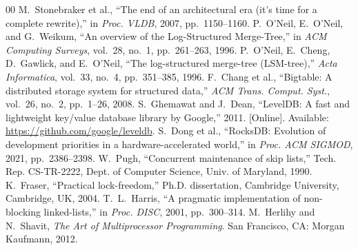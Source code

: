 \documentclass[conference]{IEEEtran}
\begin{document}
\begin{thebibliography}{00}
 M.~Stonebraker et al., ``The end of an architectural era (it's time for a complete rewrite),'' in \textit{Proc. VLDB}, 2007, pp.~1150--1160.
 P.~O'Neil, E.~O'Neil, and G.~Weikum, ``An overview of the Log-Structured Merge-Tree,'' in \textit{ACM Computing Surveys}, vol.~28, no.~1, pp.~261--263, 1996.
 P.~O'Neil, E.~Cheng, D.~Gawlick, and E.~O'Neil, ``The log-structured merge-tree (LSM-tree),'' \textit{Acta Informatica}, vol.~33, no.~4, pp.~351--385, 1996.
 F.~Chang et al., ``Bigtable: A distributed storage system for structured data,'' \textit{ACM Trans. Comput. Syst.}, vol.~26, no.~2, pp.~1--26, 2008.
 S.~Ghemawat and J.~Dean, ``LevelDB: A fast and lightweight key/value database library by Google,'' 2011. [Online]. Available: \url{https://github.com/google/leveldb}.
 S.~Dong et al., ``RocksDB: Evolution of development priorities in a hardware-accelerated world,'' in \textit{Proc. ACM SIGMOD}, 2021, pp.~2386--2398.
 W.~Pugh, ``Concurrent maintenance of skip lists,'' Tech. Rep. CS-TR-2222, Dept. of Computer Science, Univ. of Maryland, 1990.
 K.~Fraser, ``Practical lock-freedom,'' Ph.D. dissertation, Cambridge University, Cambridge, UK, 2004.
 T.~L.~Harris, ``A pragmatic implementation of non-blocking linked-lists,'' in \textit{Proc. DISC}, 2001, pp.~300--314.
 M.~Herlihy and N.~Shavit, \textit{The Art of Multiprocessor Programming}. San Francisco, CA: Morgan Kaufmann, 2012.
\end{thebibliography}
\end{document}
